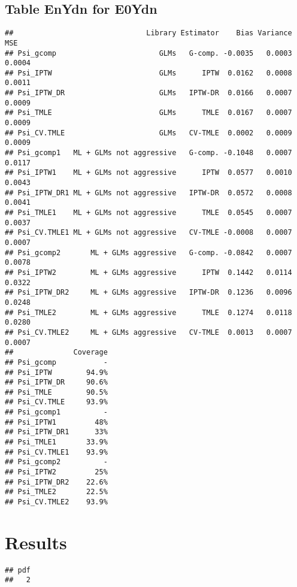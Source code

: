 \documentclass[11pt]{article}\usepackage[]{graphicx}\usepackage[]{color}
\makeatletter
\newenvironment{kframe}{%
 \def\at@end@of@kframe{}%
 \ifinner\ifhmode%
  \def\at@end@of@kframe{\end{minipage}}%
  \begin{minipage}{\columnwidth}%
 \fi\fi%
 \def\FrameCommand##1{\hskip\@totalleftmargin \hskip-\fboxsep
 \colorbox{shadecolor}{##1}\hskip-\fboxsep
     \hskip-\linewidth \hskip-\@totalleftmargin \hskip\columnwidth}%
 \MakeFramed {\advance\hsize-\width
   \@totalleftmargin\z@ \linewidth\hsize
   \@setminipage}}%
 {\par\unskip\endMakeFramed%
 \at@end@of@kframe}
\newenvironment{knitrout}{}{} %
\makeatother
\begin{document}
\subsection{Table EnYdn for E0Ydn}
\begin{knitrout}
\color{fgcolor}\begin{kframe}
\begin{verbatim}
##                               Library Estimator    Bias Variance    MSE
## Psi_gcomp                        GLMs   G-comp. -0.0035   0.0003 0.0004
## Psi_IPTW                         GLMs      IPTW  0.0162   0.0008 0.0011
## Psi_IPTW_DR                      GLMs   IPTW-DR  0.0166   0.0007 0.0009
## Psi_TMLE                         GLMs      TMLE  0.0167   0.0007 0.0009
## Psi_CV.TMLE                      GLMs   CV-TMLE  0.0002   0.0009 0.0009
## Psi_gcomp1   ML + GLMs not aggressive   G-comp. -0.1048   0.0007 0.0117
## Psi_IPTW1    ML + GLMs not aggressive      IPTW  0.0577   0.0010 0.0043
## Psi_IPTW_DR1 ML + GLMs not aggressive   IPTW-DR  0.0572   0.0008 0.0041
## Psi_TMLE1    ML + GLMs not aggressive      TMLE  0.0545   0.0007 0.0037
## Psi_CV.TMLE1 ML + GLMs not aggressive   CV-TMLE -0.0008   0.0007 0.0007
## Psi_gcomp2       ML + GLMs aggressive   G-comp. -0.0842   0.0007 0.0078
## Psi_IPTW2        ML + GLMs aggressive      IPTW  0.1442   0.0114 0.0322
## Psi_IPTW_DR2     ML + GLMs aggressive   IPTW-DR  0.1236   0.0096 0.0248
## Psi_TMLE2        ML + GLMs aggressive      TMLE  0.1274   0.0118 0.0280
## Psi_CV.TMLE2     ML + GLMs aggressive   CV-TMLE  0.0013   0.0007 0.0007
##              Coverage
## Psi_gcomp           -
## Psi_IPTW        94.9%
## Psi_IPTW_DR     90.6%
## Psi_TMLE        90.5%
## Psi_CV.TMLE     93.9%
## Psi_gcomp1          -
## Psi_IPTW1         48%
## Psi_IPTW_DR1      33%
## Psi_TMLE1       33.9%
## Psi_CV.TMLE1    93.9%
## Psi_gcomp2          -
## Psi_IPTW2         25%
## Psi_IPTW_DR2    22.6%
## Psi_TMLE2       22.5%
## Psi_CV.TMLE2    93.9%
\end{verbatim}
\end{kframe}
\end{knitrout}


\section{Results}
\begin{knitrout}
\color{fgcolor}\begin{kframe}
\begin{verbatim}
## pdf 
##   2
\end{verbatim}
\end{kframe}
\end{knitrout}
\end{document}
